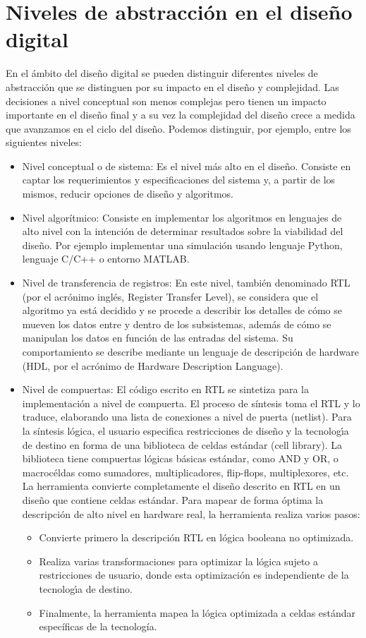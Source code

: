 \section{Niveles de abstracción en el diseño digital}

En el ámbito del diseño digital se pueden distinguir diferentes niveles de abstracción que se distinguen por su impacto en el diseño y complejidad. Las decisiones a nivel conceptual son menos complejas pero tienen un impacto importante en el diseño final y a su vez la complejidad del diseño crece a medida que avanzamos en el ciclo del diseño. Podemos distinguir, por ejemplo, entre los siguientes niveles:

\begin{itemize}
\item
Nivel conceptual o de sistema:
Es el nivel más alto en el diseño. Consiste en captar los requerimientos y especificaciones del sistema y, a partir de los mismos, reducir opciones de diseño y algoritmos.

\item
Nivel algorítmico:
Consiste en implementar los algoritmos en lenguajes de alto nivel con la intención de determinar resultados sobre la viabilidad del diseño. Por ejemplo implementar una simulación usando lenguaje Python, lenguaje C/C++ o entorno MATLAB.
\item
Nivel de transferencia de registros:
En este nivel, también denominado RTL (por el acrónimo inglés, Register Transfer Level), se considera que el algoritmo ya está decidido y se procede a describir los detalles de cómo se mueven los datos entre y dentro de los subsistemas, además de cómo se manipulan los datos en función de las entradas del sistema. Su comportamiento se describe mediante un lenguaje de descripción de hardware (HDL, por el acrónimo de Hardware Description Language).
\item
Nivel de compuertas:
El código escrito en RTL se sintetiza para la implementación a nivel de compuerta. El proceso de síntesis toma el RTL y lo traduce, elaborando una lista de conexiones a nivel de puerta (netlist). Para la síntesis lógica, el usuario especifica restricciones de diseño y la tecnologı́a de destino en forma de una biblioteca de celdas estándar (cell library). La biblioteca tiene compuertas lógicas básicas estándar, como AND y OR, o macrocéldas como sumadores, multiplicadores, flip-flops, multiplexores, etc.
La herramienta convierte completamente el diseño descrito en RTL en un diseño que contiene celdas estándar. Para mapear de forma óptima la descripción de alto nivel en hardware real, la herramienta realiza varios pasos:
\begin{itemize}
\item
Convierte primero la descripción RTL en lógica booleana no optimizada.
\item
Realiza varias transformaciones para optimizar la lógica sujeto a restricciones de usuario, donde esta optimización es independiente de la tecnologı́a de destino.
\item
Finalmente, la herramienta mapea la lógica optimizada a celdas estándar específicas de la tecnología.
\end{itemize}



\end{itemize}
